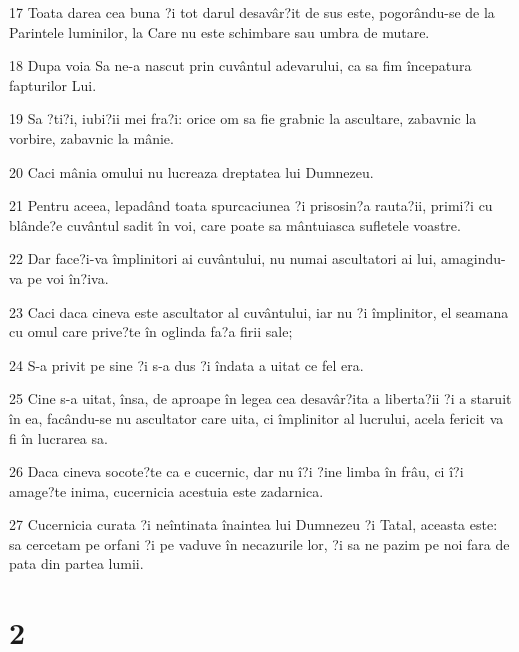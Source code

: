 \par 17 Toata darea cea buna ?i tot darul desavâr?it de sus este, pogorându-se de la Parintele luminilor, la Care nu este schimbare sau umbra de mutare.
\par 18 Dupa voia Sa ne-a nascut prin cuvântul adevarului, ca sa fim începatura fapturilor Lui.
\par 19 Sa ?ti?i, iubi?ii mei fra?i: orice om sa fie grabnic la ascultare, zabavnic la vorbire, zabavnic la mânie.
\par 20 Caci mânia omului nu lucreaza dreptatea lui Dumnezeu.
\par 21 Pentru aceea, lepadând toata spurcaciunea ?i prisosin?a rauta?ii, primi?i cu blânde?e cuvântul sadit în voi, care poate sa mântuiasca sufletele voastre.
\par 22 Dar face?i-va împlinitori ai cuvântului, nu numai ascultatori ai lui, amagindu-va pe voi în?iva.
\par 23 Caci daca cineva este ascultator al cuvântului, iar nu ?i împlinitor, el seamana cu omul care prive?te în oglinda fa?a firii sale;
\par 24 S-a privit pe sine ?i s-a dus ?i îndata a uitat ce fel era.
\par 25 Cine s-a uitat, însa, de aproape în legea cea desavâr?ita a liberta?ii ?i a staruit în ea, facându-se nu ascultator care uita, ci împlinitor al lucrului, acela fericit va fi în lucrarea sa.
\par 26 Daca cineva socote?te ca e cucernic, dar nu î?i ?ine limba în frâu, ci î?i amage?te inima, cucernicia acestuia este zadarnica.
\par 27 Cucernicia curata ?i neîntinata înaintea lui Dumnezeu ?i Tatal, aceasta este: sa cercetam pe orfani ?i pe vaduve în necazurile lor, ?i sa ne pazim pe noi fara de pata din partea lumii.

\chapter{2}

